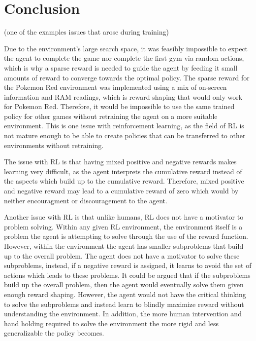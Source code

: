 \section{Conclusion}


(one of the examples issues that arose during training)

Due to the environment's large search space, it was feasibly impossible to expect the agent to complete the game nor complete the first gym via random actions, which is why a sparse reward is needed to guide the agent by feeding it small amounts of reward to converge towards the optimal policy. The sparse reward for the Pokemon Red environment was implemented using a mix of on-screen information and RAM readings, which is reward shaping that would only work for Pokemon Red. Therefore, it would be impossible to use the same trained policy for other games without retraining the agent on a more suitable environment. This is one issue with reinforcement learning, as the field of RL is not mature enough to be able to create policies that can be transferred to other environments without retraining.

The issue with RL is that having mixed positive and negative rewards makes learning very difficult, as the agent interprets the cumulative reward instead of the aspects  which build up to the cumulative reward. Therefore, mixed positive and negative reward may lead to a cumulative reward of zero which would by neither encouragment or discouragement to the agent. 

Another issue with RL is that unlike humans, RL does not have a motivator to problem solving. Within any given RL environment, the environment itself is a problem the agent is attempting to solve through the use of the reward function. However, within the environment the agent has smaller subproblems that build up to the overall problem. The agent does not have a motivator to solve these subproblems, instead, if a negative reward is assigned, it learns to avoid the set of actions which leads to these problems. It could be argued that if the subproblems build up the overall problem, then the agent would eventually solve them given enough reward shaping. However, the agent would not have the critical thinking to solve the subproblems and instead learn to blindly maximize reward without understanding the environment. In addition, the more human intervention and hand holding required to solve the environment the more rigid and less generalizable the policy becomes.
